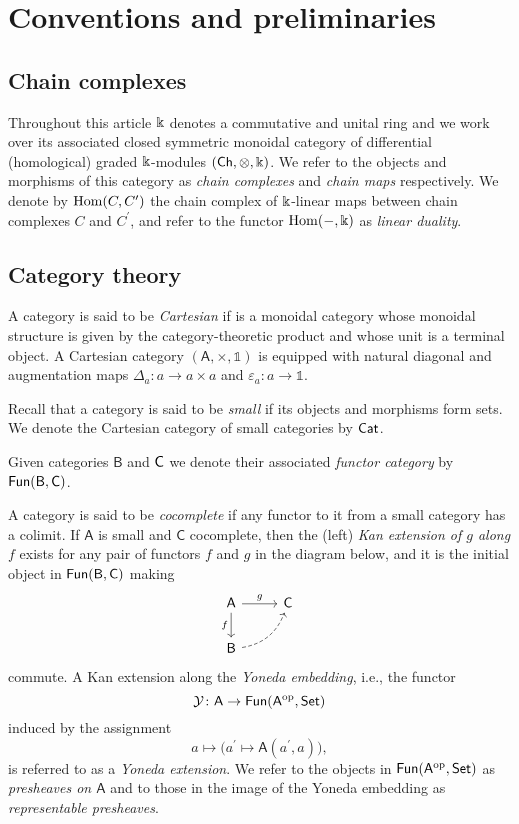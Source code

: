 
\section{Conventions and preliminaries} \label{s:preliminaries}

\subsection{Chain complexes }

Throughout this article $\Bbbk$ denotes a commutative and unital ring and we work over its associated closed symmetric monoidal category of differential (homological) graded $\Bbbk$-modules $(\mathsf{Ch}, \otimes, \Bbbk)$.
We refer to the objects and morphisms of this category as \textit{chain complexes} and \textit{chain maps} respectively. We denote by $\mathrm{Hom}(C, C^\prime)$ the chain complex of $\Bbbk$-linear maps between chain complexes $C$ and $C^\prime$, and refer to the functor $\mathrm{Hom}(-, \Bbbk)$ as \textit{linear duality}.

\subsection{Category theory}

A category is said to be \textit{Cartesian} if is a monoidal category whose monoidal structure is given by the category-theoretic product and whose unit is a terminal object.
A Cartesian category $(\mathsf{A}, \times, \mathbb{1})$ is equipped with natural diagonal and augmentation maps $\Delta_a \colon a \to a \times a$ and $\varepsilon_a \colon a \to \mathbb{1}$.

Recall that a category is said to be \textit{small} if its objects and morphisms form sets.
We denote the Cartesian category of small categories by $\mathsf{Cat}$.

Given categories $\mathsf{B}$ and $\mathsf{C}$ we denote their associated \textit{functor category} by $\mathsf{Fun}(\mathsf{B}, \mathsf{C})$.

A category is said to be \textit{cocomplete} if any functor to it from a small category has a colimit.
If $\mathsf{A}$ is small and $\mathsf{C}$ cocomplete, then the (left) \textit{Kan extension of $g$ along $f$} exists for any pair of functors $f$ and $g$ in the diagram below, and it is the initial object in $\mathsf{Fun}(\mathsf{B}, \mathsf{C})$ making
\begin{equation*}
\begin{tikzcd}[column sep=normal, row sep=normal]
\mathsf{A} \arrow[d, "f"'] \arrow[r, "g"] & \mathsf{C} \\
\mathsf{B} \arrow[dashed, ur, bend right] & \quad
\end{tikzcd}
\end{equation*}
commute.
A Kan extension along the \textit{Yoneda embedding}, i.e., the functor
\[
\mathcal{Y} \colon \mathsf{A} \to \mathsf{Fun}(\mathsf{A}^{\mathrm{op}}, \mathsf{Set})
\]
induced by the assignment
\[
a \mapsto \big( a^\prime \mapsto \mathsf{A}(a^\prime, a) \big),
\]
is referred to as a \textit{Yoneda extension}.
We refer to the objects in $\mathsf{Fun}(\mathsf{A}^{\mathrm{op}}, \mathsf{Set})$ as \textit{presheaves on $\mathsf{A}$} and to those in the image of the Yoneda embedding as \textit{representable presheaves}.

